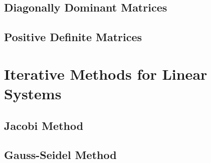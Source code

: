 \documentclass[8pt, letterpaper]{extarticle}
\begin{document}
\begin{multicols*}{3}
  \subsection{Diagonally Dominant Matrices}
  \subsection{Positive Definite Matrices} %

  \section{Iterative Methods for Linear Systems}
  \subsection{Jacobi Method}
  \subsection{Gauss-Seidel Method}

\end{multicols*}
\end{document}
